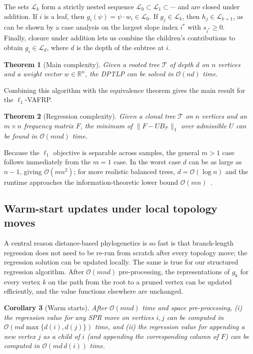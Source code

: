 \documentclass[11pt]{article}
\newtheorem{theorem}{Theorem}
\newtheorem{corollary}[theorem]{Corollary}
\begin{document}
The sets $\mathcal{L}_k$ form a strictly nested sequence $\mathcal{L}_0\subset\mathcal{L}_1\subset\cdots$ and are closed under addition. If $i$ is a leaf, then $g_i(\psi) = \psi \cdot w_i\in\mathcal{L}_0$. If $g_j\in\mathcal{L}_k$, then $h_j\in\mathcal{L}_{k+1}$, as can be shown by a case analysis on the largest slope index $i^*$ with $s_{i^*}\geq 0$. Finally, closure under addition lets us combine the children's contributions to obtain $g_i\in\mathcal{L}_d$, where $d$ is the depth of the subtree at $i$.

\begin{theorem}[Main complexity]
Given a rooted tree $\mathcal{T}$ of depth $d$ on $n$ vertices and a weight vector $w\in\mathbb{R}^n$, the DPTLP can be solved in $\mathcal{O}(nd)$ time.
\end{theorem}

Combining this algorithm with the equivalence theorem gives the main result for the $\ell_1$-VAFRP.

\begin{theorem}[Regression complexity]
Given a clonal tree $\mathcal{T}$ on $n$ vertices and an $m \times n$ frequency matrix $F$, the minimum of $\|F - UB_{\mathcal{T}}\|_1$ over admissible $U$ can be found in $\mathcal{O}(mnd)$ time.
\end{theorem}

Because the $\ell_1$ objective is separable across samples, the general $m > 1$ case follows immediately from the $m=1$ case. In the worst case $d$ can be as large as $n-1$, giving $\mathcal{O}(mn^2)$; for more realistic balanced trees, $d = \mathcal{O}(\log n)$ and the runtime approaches the information-theoretic lower bound $\mathcal{O}(mn)$~\citep{elkebir2015reconstruction}.

\subsection{Warm-start updates under local topology moves}

A central reason distance-based phylogenetics is so fast is that branch-length regression does not need to be re-run from scratch after every topology move; the regression solution can be updated locally. The same is true for our structured regression algorithm. After $\mathcal{O}(mnd)$ pre-processing, the representations of $g_k$ for every vertex $k$ on the path from the root to a pruned vertex can be updated efficiently, and the value functions elsewhere are unchanged.

\begin{corollary}[Warm starts]
After $\mathcal{O}(mnd)$ time and space pre-processing,
(i) the regression value for any SPR move on vertices $i, j$ can be computed in $\mathcal{O}(md\max\{d(i), d(j)\})$ time, and
(ii) the regression value for appending a new vertex $j$ as a child of $i$ (and appending the corresponding column of $F$) can be computed in $\mathcal{O}(md\,d(i))$ time.
\end{corollary}
\end{document}
